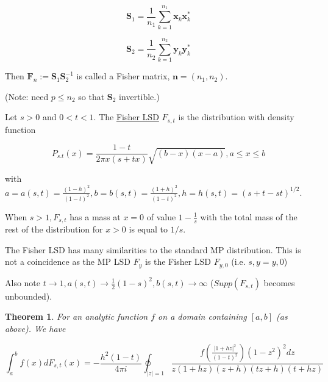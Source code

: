 \documentclass[twoside]{article}
\newcounter{lecnum}
\newtheorem{theorem}{Theorem}[lecnum]
\begin{document}
$$\mathbf{S}_1=\frac{1}{n_1}\sum^{n_1}_{k=1}\mathbf{x}_k\mathbf{x}_k^*$$

$$\mathbf{S}_2=\frac{1}{n_2}\sum^{n_2}_{k=1}\mathbf{y}_k\mathbf{y}_k^*$$

Then $\mathbf{F}_n:=\mathbf{S}_1\mathbf{S}_2^{-1}$ is called a Fisher matrix, $\mathbf{n}=(n_1,n_2).$

(Note: need $p\leq n_2$ so that $\mathbf{S}_2$ invertible.)

Let $s>0$ and $0<t<1$. The \underline{Fisher LSD} $F_{s,t}$ is the distribution with density function

$$P_{s.t}(x)=\frac{1-t}{2\pi x(s+tx)}\sqrt{(b-x)(x-a)}, a\leq x\leq b$$

with $a=a(s,t)=\frac{(1-h)^2}{(1-t)^2}, b= b(s,t)=\frac{(1+h)^2}{(1-t)^2}, h=h(s,t)=(s+t-st)^{1/2}$.

When $s>1, F_{s,t}$ has a mass at $x=0$ of value $1-\frac{1}{s}$ with the total mass of the rest of the distribution for $x>0$ is equal to $1/s$.

The Fisher LSD has many similarities to the standard MP distribution. This is not a coincidence as the MP LSD $F_y$ is the Fisher LSD $F_{y,0}$ (i.e. $s,y=y,0$)

Also note $t\to 1, a(s,t)\to \frac{1}{2}(1-s)^2, b(s,t)\to \infty$ ($Supp(F_{s,t})$ becomes unbounded).

\begin{theorem}
	For an analytic function $f$ on a domain containing $[a,b]$ (as above). We have
	
	$$\int^b_af(x)dF_{s,t}(x)=-\frac{h^2(1-t)}{4\pi i}\oint_{\lvert z\rvert = 1}\frac{f\left(\frac{|1+hz|^2}{(1-t)^2}\right)(1-z^2)^2dz}{z(1+hz)(z+h)(tz+h)(t+hz)}$$
\end{theorem}
\end{document}

